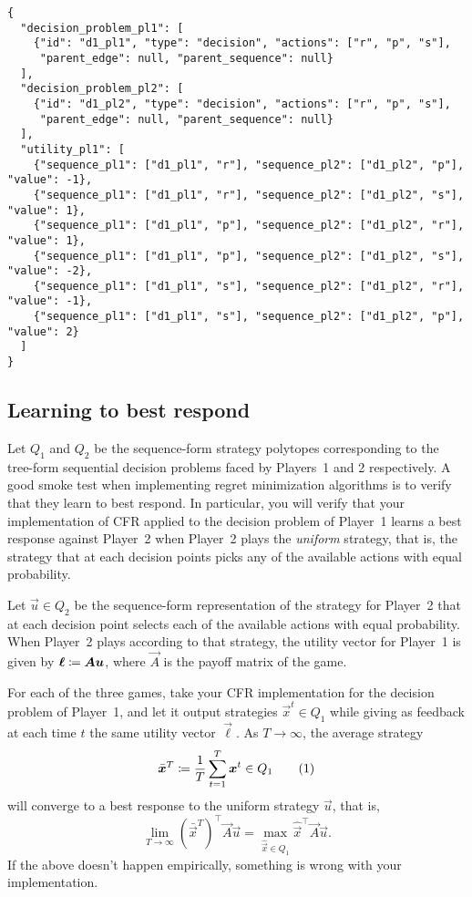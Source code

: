 \documentclass{homework}
\begin{document}
{\small\begin{verbatim}
{
  "decision_problem_pl1": [
    {"id": "d1_pl1", "type": "decision", "actions": ["r", "p", "s"],
     "parent_edge": null, "parent_sequence": null}
  ],
  "decision_problem_pl2": [
    {"id": "d1_pl2", "type": "decision", "actions": ["r", "p", "s"],
     "parent_edge": null, "parent_sequence": null}
  ],
  "utility_pl1": [
    {"sequence_pl1": ["d1_pl1", "r"], "sequence_pl2": ["d1_pl2", "p"], "value": -1},
    {"sequence_pl1": ["d1_pl1", "r"], "sequence_pl2": ["d1_pl2", "s"], "value": 1},
    {"sequence_pl1": ["d1_pl1", "p"], "sequence_pl2": ["d1_pl2", "r"], "value": 1},
    {"sequence_pl1": ["d1_pl1", "p"], "sequence_pl2": ["d1_pl2", "s"], "value": -2},
    {"sequence_pl1": ["d1_pl1", "s"], "sequence_pl2": ["d1_pl2", "r"], "value": -1},
    {"sequence_pl1": ["d1_pl1", "s"], "sequence_pl2": ["d1_pl2", "p"], "value": 2}
  ]
}
\end{verbatim}}

\subsection{Learning to best respond}

Let $Q_1$ and $Q_2$ be the sequence-form strategy polytopes corresponding to the tree-form sequential decision problems faced by Players~1 and 2 respectively.
%
A good smoke test when implementing regret minimization algorithms is to verify that they learn to best respond. In particular, you will verify that your implementation of CFR applied to the decision problem of Player~1 learns a best response against Player~2 when Player~2 plays the \emph{uniform} strategy, that is, the strategy that at each decision points picks any of the available actions with equal probability.


Let $\vec{u} \in Q_2$ be the sequence-form representation of the strategy for Player~2 that at each decision point selects each of the available actions with equal probability.
When Player~2 plays according to that strategy, the utility vector for Player~1 is given by $\bm{\ell} \coloneqq \bm{A}\bm{u}$, where $\vec{A}$ is the payoff matrix of the game.

For each of the three games, take your CFR implementation for the decision problem of Player~1, and let it output strategies $\vec{x}^t \in Q_1$ while giving as feedback at each time $t$ the same utility vector $\vec{\ell}$. As $T \to \infty$, the average strategy 
\[
    \bar{\vec{x}}^T \defeq \frac{1}{T} \sum_{t=1}^T \vec{x}^t \in Q_1
    \numberthis{eq:avg pl1}
\]
will converge to a best response to the uniform strategy $\vec{u}$, that is,
\[
    \lim_{T\to\infty} (\bar{\vec{x}}^T)^\top\! \vec{A} \vec{u} = \max_{\hat{\vec{x}}\in Q_1}  \hat{\vec{x}}^\top\! \vec{A}\vec{u}.
\]
If the above doesn't happen empirically, something is wrong with your implementation.
\end{document}
